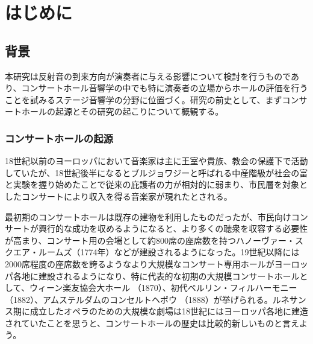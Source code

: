 \documentclass[11pt,a4j]{jreport}
\begin{document}
\chapter{はじめに}

\section{背景} %
本研究は反射音の到来方向が演奏者に与える影響について検討を行うものであり、コンサートホール音響学の中でも特に演奏者の立場からホールの評価を行うことを試みるステージ音響学の分野に位置づく。研究の前史として、まずコンサートホールの起源とその研究の起こりについて概観する。

\subsection*{コンサートホールの起源}
18世紀以前のヨーロッパにおいて音楽家は主に王室や貴族、教会の保護下で活動していたが、18世紀後半になるとブルジョワジーと呼ばれる中産階級が社会の富と実験を握り始めたことで従来の庇護者の力が相対的に弱まり、市民層を対象としたコンサートにより収入を得る音楽家が現れたとされる。

最初期のコンサートホールは既存の建物を利用したものだったが、市民向けコンサートが興行的な成功を収めるようになると、より多くの聴衆を収容する必要性が高まり、コンサート用の会場として約800席の座席数を持つハノーヴァー・スクエア・ルームズ（1774年）などが建設されるようになった。19世紀以降には2000席程度の座席数を誇るようなより大規模なコンサート専用ホールがヨーロッパ各地に建設されるようになり、特に代表的な初期の大規模コンサートホールとして、ウィーン楽友協会大ホール （1870）、初代ベルリン・フィルハーモニー （1882）、アムステルダムのコンセルトヘボウ （1888）が挙げられる。ルネサンス期に成立したオペラのための大規模な劇場は18世紀にはヨーロッパ各地に建造されていたことを思うと、コンサートホールの歴史は比較的新しいものと言えよう。

\vspace{1\baselineskip}
\end{document}
